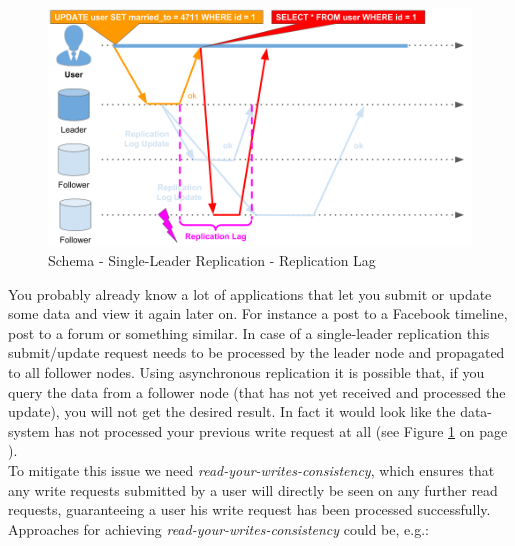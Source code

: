 {\begin{figure}[h]
	\centering
  \includegraphics[width=1\textwidth]{replication_schema_sl_replication_lag.png}
	\caption{Schema - Single-Leader Replication - Replication Lag}
	\label{schema_replication_sl_replication_lag}
\end{figure}

\newpage
{}
You probably already know a lot of applications that let you submit or update some data and view it again later on. For instance a post to a Facebook timeline, post to a forum or something similar. In case of a single-leader replication this submit/update request needs to be processed by the leader node and propagated to all follower nodes. Using asynchronous replication it is possible that, if you query the data from a follower node (that has not yet received and processed the update), you will not get the desired result. In fact it would look like the data-system has not processed your previous write request at all (see Figure \ref{schema_replication_sl_replication_lag} on page \pageref{schema_replication_sl_replication_lag}).\\
To mitigate this issue we need \textit{read-your-writes-consistency}, which ensures that any write requests submitted by a user will directly be seen on any further read requests, guaranteeing a user his write request has been processed successfully. Approaches for achieving \textit{read-your-writes-consistency} could be, e.g.:\\

}
